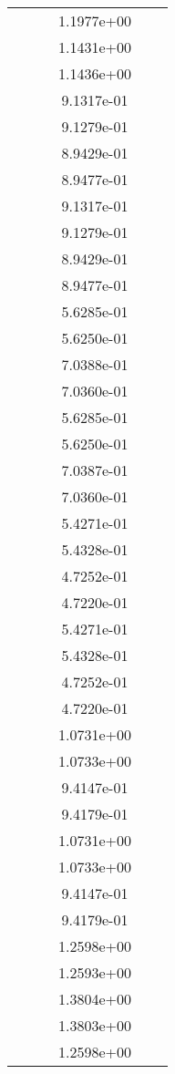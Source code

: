 \begin{xltabular}{\textwidth}{r|rS[table-format=1.3e+2]S[table-format=1.4e+2]S[table-format=1.4e+2]S[table-format=-1.5]}
&  &  & 1.1977e+00 & & \\
&  &  & 1.1431e+00 & & \\
&  &  & 1.1436e+00 & & \\
&  &  & 9.1317e-01 & & \\
&  &  & 9.1279e-01 & & \\
&  &  & 8.9429e-01 & & \\
&  &  & 8.9477e-01 & & \\
&  &  & 9.1317e-01 & & \\
&  &  & 9.1279e-01 & & \\
&  &  & 8.9429e-01 & & \\
&  &  & 8.9477e-01 & & \\
&  &  & 5.6285e-01 & & \\
&  &  & 5.6250e-01 & & \\
&  &  & 7.0388e-01 & & \\
&  &  & 7.0360e-01 & & \\
&  &  & 5.6285e-01 & & \\
&  &  & 5.6250e-01 & & \\
&  &  & 7.0387e-01 & & \\
&  &  & 7.0360e-01 & & \\
&  &  & 5.4271e-01 & & \\
&  &  & 5.4328e-01 & & \\
&  &  & 4.7252e-01 & & \\
&  &  & 4.7220e-01 & & \\
&  &  & 5.4271e-01 & & \\
&  &  & 5.4328e-01 & & \\
&  &  & 4.7252e-01 & & \\
&  &  & 4.7220e-01 & & \\
&  &  & 1.0731e+00 & & \\
&  &  & 1.0733e+00 & & \\
&  &  & 9.4147e-01 & & \\
&  &  & 9.4179e-01 & & \\
&  &  & 1.0731e+00 & & \\
&  &  & 1.0733e+00 & & \\
&  &  & 9.4147e-01 & & \\
&  &  & 9.4179e-01 & & \\
&  &  & 1.2598e+00 & & \\
&  &  & 1.2593e+00 & & \\
&  &  & 1.3804e+00 & & \\
&  &  & 1.3803e+00 & & \\
&  &  & 1.2598e+00 & & \\

\end{xltabular}
